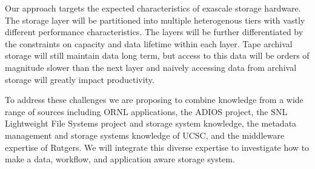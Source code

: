 Our approach targets the expected characteristics of exascale storage
hardware. The storage layer will be partitioned into multiple heterogenous
tiers with vastly different performance characteristics. The layers
will be further differentiated by the constraints on capacity
and data lifetime within each layer. Tape archival storage will still maintain
data long term, but access to this data will be orders of magnitude slower
than the next layer and naively accessing data from archival storage will
greatly impact productivity.

To address these challenges we are proposing to combine knowledge
from a wide range of sources including ORNL applications, the ADIOS project,
the SNL Lightweight File Systems project and storage system knowledge, the metadata
management and storage systems knowledge of UCSC, and the middleware expertise
of Rutgers. We will integrate this diverse expertise to investigate how to make
a data, workflow, and application aware storage system.


